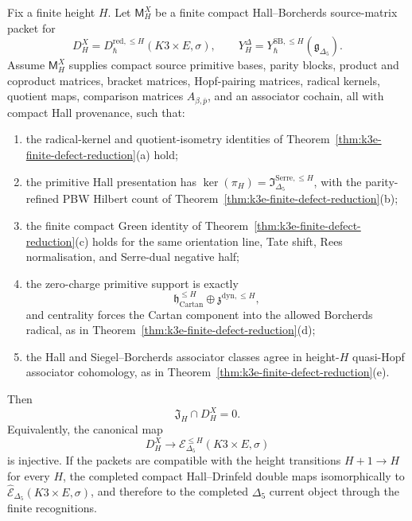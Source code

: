 \begin{theorem}
\label{thm:k3e-source-matrix-faithfulness}
Fix a finite height \(H\). Let \(\mathsf M^X_H\) be a finite compact
Hall--Borcherds source-matrix packet for
\[
 D_H^X=
 D^{\mathrm{red},\leq H}_{\hbar}(K3\times E,\sigma),
 \qquad
 Y_H^\Delta=
 Y^{\mathrm{SB},\leq H}_{\hbar}(\mathfrak g_{\Delta_5}).
\]
Assume \(\mathsf M^X_H\) supplies compact source primitive bases,
parity blocks, product and coproduct matrices, bracket matrices,
Hopf-pairing matrices, radical kernels, quotient maps, comparison
matrices \(A_{\beta,\bar p}\), and an associator cochain, all with
compact Hall provenance, such that:
\begin{enumerate}[label=\textup{(\roman*)}]
\item the radical-kernel and quotient-isometry identities of
Theorem~\ref{thm:k3e-finite-defect-reduction}\textup{(a)} hold;
\item the primitive Hall presentation has
\(\ker(\pi_H)=\mathfrak I^{\mathrm{Serre},\leq H}_{\Delta_5}\), with
the parity-refined PBW Hilbert count of
Theorem~\ref{thm:k3e-finite-defect-reduction}\textup{(b)};
\item the finite compact Green identity of
Theorem~\ref{thm:k3e-finite-defect-reduction}\textup{(c)} holds for
the same orientation line, Tate shift, Rees normalisation, and
Serre-dual negative half;
\item the zero-charge primitive support is exactly
\[
 \mathfrak h^{\leq H}_{\mathrm{Cartan}}
 \oplus
 \mathfrak z^{\mathrm{dyn},\leq H},
\]
and centrality forces the Cartan component into the allowed
Borcherds radical, as in
Theorem~\ref{thm:k3e-finite-defect-reduction}\textup{(d)};
\item the Hall and Siegel--Borcherds associator classes agree in
height-\(H\) quasi-Hopf associator cohomology, as in
Theorem~\ref{thm:k3e-finite-defect-reduction}\textup{(e)}.
\end{enumerate}
Then
\[
 \mathfrak J_H\cap D_H^X=0 .
\]
Equivalently, the canonical map
\[
 D_H^X\longrightarrow
 \mathcal E^{\leq H}_{\Delta_5}(K3\times E,\sigma)
\]
is injective. If the packets are compatible with the height
transitions \(H+1\to H\) for every \(H\), the completed compact
Hall--Drinfeld double maps isomorphically to
\(\widehat{\mathcal E}_{\Delta_5}(K3\times E,\sigma)\), and therefore
to the completed \(\Delta_5\) current object through the finite
recognitions.
\end{theorem}

